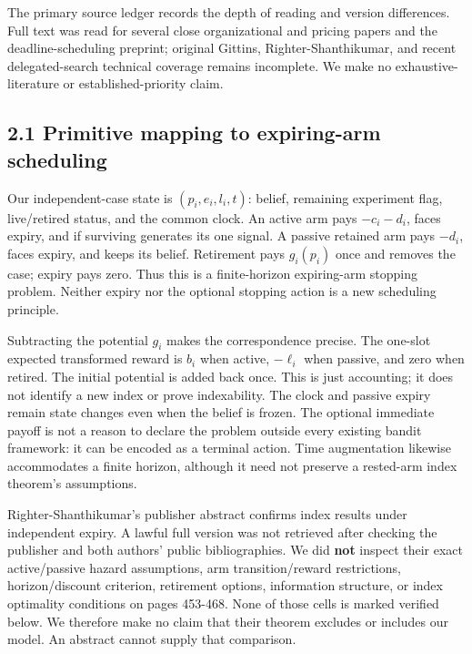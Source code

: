 \documentclass[
  11pt,
]{article}
\begin{document}
The primary source ledger records the depth of reading and version
differences. Full text was read for several close organizational and
pricing papers and the deadline-scheduling preprint; original Gittins,
Righter-Shanthikumar, and recent delegated-search technical coverage
remains incomplete. We make no exhaustive-literature or
established-priority claim.

\subsection{2.1 Primitive mapping to expiring-arm
scheduling}\label{primitive-mapping-to-expiring-arm-scheduling}

Our independent-case state is \((p_i,e_i,l_i,t)\): belief, remaining
experiment flag, live/retired status, and the common clock. An active
arm pays \(-c_i-d_i\), faces expiry, and if surviving generates its one
signal. A passive retained arm pays \(-d_i\), faces expiry, and keeps
its belief. Retirement pays \(g_i(p_i)\) once and removes the case;
expiry pays zero. Thus this is a finite-horizon expiring-arm stopping
problem. Neither expiry nor the optional stopping action is a new
scheduling principle.

Subtracting the potential \(g_i\) makes the correspondence precise. The
one-slot expected transformed reward is \(b_i\) when active, \(-\ell_i\)
when passive, and zero when retired. The initial potential is added back
once. This is just accounting; it does not identify a new index or prove
indexability. The clock and passive expiry remain state changes even
when the belief is frozen. The optional immediate payoff is not a reason
to declare the problem outside every existing bandit framework: it can
be encoded as a terminal action. Time augmentation likewise accommodates
a finite horizon, although it need not preserve a rested-arm index
theorem's assumptions.

Righter-Shanthikumar's publisher abstract confirms index results under
independent expiry. A lawful full version was not retrieved after
checking the publisher and both authors' public bibliographies. We did
\textbf{not} inspect their exact active/passive hazard assumptions, arm
transition/reward restrictions, horizon/discount criterion, retirement
options, information structure, or index optimality conditions on pages
453-468. None of those cells is marked verified below. We therefore make
no claim that their theorem excludes or includes our model. An abstract
cannot supply that comparison.
\end{document}
